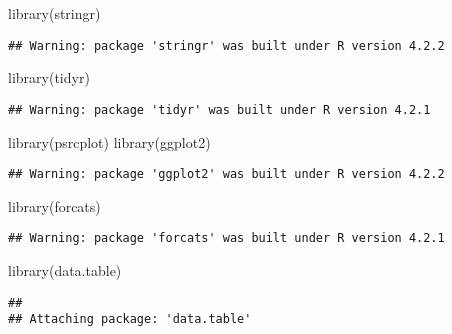 \documentclass[
]{article}
\newenvironment{Shaded}{\begin{snugshade}}{\end{snugshade}}
\newcommand{\FunctionTok}[1]{\textcolor[rgb]{0.00,0.00,0.00}{#1}}
\newcommand{\NormalTok}[1]{#1}
\begin{document}
\begin{Shaded}
\begin{Highlighting}[]
\FunctionTok{library}\NormalTok{(stringr)}
\end{Highlighting}
\end{Shaded}

\begin{verbatim}
## Warning: package 'stringr' was built under R version 4.2.2
\end{verbatim}

\begin{Shaded}
\begin{Highlighting}[]
\FunctionTok{library}\NormalTok{(tidyr)}
\end{Highlighting}
\end{Shaded}

\begin{verbatim}
## Warning: package 'tidyr' was built under R version 4.2.1
\end{verbatim}

\begin{Shaded}
\begin{Highlighting}[]
\FunctionTok{library}\NormalTok{(psrcplot)}
\FunctionTok{library}\NormalTok{(ggplot2)}
\end{Highlighting}
\end{Shaded}

\begin{verbatim}
## Warning: package 'ggplot2' was built under R version 4.2.2
\end{verbatim}

\begin{Shaded}
\begin{Highlighting}[]
\FunctionTok{library}\NormalTok{(forcats)}
\end{Highlighting}
\end{Shaded}

\begin{verbatim}
## Warning: package 'forcats' was built under R version 4.2.1
\end{verbatim}

\begin{Shaded}
\begin{Highlighting}[]
\FunctionTok{library}\NormalTok{(data.table)}
\end{Highlighting}
\end{Shaded}

\begin{verbatim}
## 
## Attaching package: 'data.table'
\end{verbatim}
\end{document}
